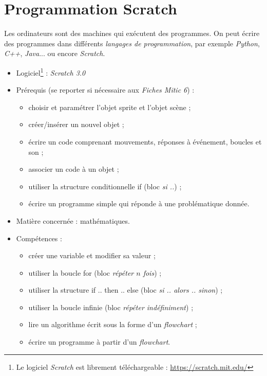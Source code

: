\chapter{Programmation Scratch}  


Les ordinateurs sont des machines qui exécutent des programmes. On peut écrire des programmes dans différents \emph{langages de programmation}, par exemple \emph{Python}, \emph{C++}, \emph{Java}... ou encore \emph{Scratch}.\\



{\footnotesize
\begin{itemize}
\item Logiciel\footnote{Le logiciel \emph{Scratch} est librement téléchargeable : \url{https://scratch.mit.edu/}} : \emph{Scratch 3.0}
\item Prérequis (se reporter si nécessaire aux \emph{Fiches Mitic 6}) : 
        \begin{itemize}
        \item choisir et paramétrer l'objet sprite et l'objet scène ;
        \item créer/insérer un nouvel objet ; 
        \item écrire un code comprenant mouvements, réponses à événement, boucles et son ;
        \item associer un code à un objet ;
        \item utiliser la structure conditionnelle if (bloc \emph{si ..}) ; 
        \item écrire un programme simple qui réponde à une problématique donnée.
        \end{itemize}
\item Matière concernée : mathématiques.
\item Compétences : 
        \begin{itemize}
        \item créer une variable et modifier sa valeur ;
        \item utiliser la boucle for (bloc \emph{répéter $n$ fois}) ;
        \item utiliser la structure if .. then .. else (bloc \emph{si .. alors .. sinon}) ; 
        \item utiliser la boucle infinie (bloc \emph{répéter indéfiniment}) ;
        \item lire un algorithme écrit sous la forme d'un \emph{flowchart} ;
        \item écrire un programme à partir d'un \emph{flowchart}.
        \end{itemize}
\end{itemize}
} %
